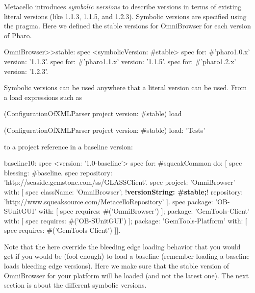 \documentclass[a4paper,10pt,twoside]{book}
\begin{document}
Metacello introduces \emph{symbolic versions} to describe versions in terms of existing literal versions (like 1.1.3, 1.1.5, and 1.2.3). Symbolic versions are specified using the  pragma. Here we defined the stable versions for OmniBrowser for each version of Pharo.

\begin{code}{}
OmniBrowser>>stable: spec
     <symbolicVersion: #stable>
     spec for: #'pharo1.0.x' version: '1.1.3'.
     spec for: #'pharo1.1.x' version: '1.1.5'.
     spec for: #'pharo1.2.x' version: '1.2.3'.
\end{code}

Symbolic versions can be used anywhere that a literal version can be used. From a load expressions such as 

\begin{code}{}
(ConfigurationOfXMLParser project version: #stable) load

(ConfigurationOfXMLParser project version: #stable) load: 'Tests'
\end{code}

to a project reference in a baseline version:

\begin{code}{}
baseline10: spec
     <version: '1.0-baseline'>
     spec for: #squeakCommon do: [
          spec blessing: #baseline.
          spec repository: 'http://seaside.gemstone.com/ss/GLASSClient'.
     spec
          project: 'OmniBrowser' with: [
          spec
               className: 'OmniBrowser';
               !\textbf{versionString: \#stable;}!
               repository: 'http://www.squeaksource.com/MetacelloRepository' ].
     spec
         package: 'OB-SUnitGUI' with: [
               spec requires: #('OmniBrowser') ];
         package: 'GemTools-Client' with: [
               spec requires: #('OB-SUnitGUI') ];
         package: 'GemTools-Platform' with: [
               spec requires: #('GemTools-Client') ]].
\end{code}

Note that the  here override the bleeding edge loading behavior that you would get if you would be (fool enough) to load a baseline (remember loading a baseline loads bleeding edge versions). Here we make sure that the stable version of OmniBrowser for your platform will be loaded (and not the latest one). The next section is about the different symbolic versions.
    
   
    
\end{document}
